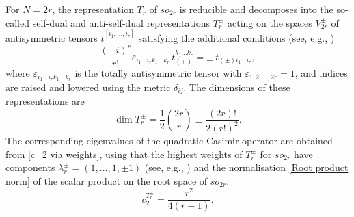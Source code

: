 \documentclass[a4paper]{article}
\renewcommand{\=}{\ =\ }
\numberwithin{equation}{section}
\theoremstyle{remark}
\begin{document}
For $N=2r$, the representation $T_r$ of $so_{2r}$ is reducible and decomposes into the so-called self-dual and anti-self-dual representations $T_r^\pm$ acting on the spaces $V_{2r}^\pm$ of antisymmetric tensors $t_\pm^{[i_1,\dots,i_r]}$ satisfying the additional conditions (see, e.g., \cite{IsRu2})
\begin{equation}
\frac{(-i)^r}{r!}\varepsilon_{i_1\dots i_r k_1\dots k_r}\, t_{(\pm)}^{k_1\dots k_r}
=
\pm\, t_{(\pm)i_1\dots i_r},
\end{equation}
where $\varepsilon_{i_1\dots i_r k_1\dots k_r}$ is the totally antisymmetric tensor with $\varepsilon_{1,2,\dots,2r}=1$, and indices are raised and lowered using the metric $\delta_{ij}$. The dimensions of these representations are
\begin{equation}\label{T_(pm)^(wedge nu) dimension}
\dim T_r^\pm=\frac{1}{2}{2r \choose r}\equiv \frac{(2r)!}{2(r!)^2}.
\end{equation}
The corresponding eigenvalues of the quadratic Casimir operator are obtained from \eqref{c_2 via weights}, using that the highest weights of $T_r^\pm$ for $so_{2r}$ have components $\lambda_r^\pm=(1,\dots,1,\pm 1)$ (see, e.g., \cite{FultonHarris}) and the normalisation \eqref{Root product norm} of the scalar product on the root space of $so_{2r}$:
\begin{equation}\label{c_2 on T_pm^(wedge nu)}
c_2^{T_r^\pm}=\frac{r^2}{4(r-1)}.
\end{equation}
\end{document}
